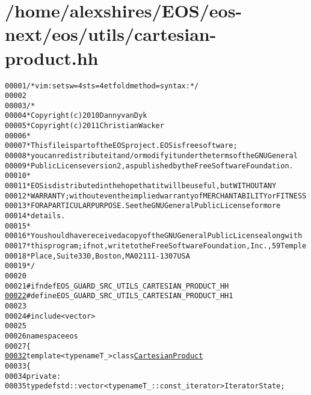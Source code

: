 \hypertarget{cartesian-product_8hh_source}{
\section{/home/alexshires/EOS/eos-\/next/eos/utils/cartesian-\/product.hh}
}


\begin{footnotesize}\begin{alltt}
00001 \textcolor{comment}{/* vim: set sw=4 sts=4 et foldmethod=syntax : */}
00002 
00003 \textcolor{comment}{/*}
00004 \textcolor{comment}{ * Copyright (c) 2010 Danny van Dyk}
00005 \textcolor{comment}{ * Copyright (c) 2011 Christian Wacker}
00006 \textcolor{comment}{ *}
00007 \textcolor{comment}{ * This file is part of the EOS project. EOS is free software;}
00008 \textcolor{comment}{ * you can redistribute it and/or modify it under the terms of the GNU General}
00009 \textcolor{comment}{ * Public License version 2, as published by the Free Software Foundation.}
00010 \textcolor{comment}{ *}
00011 \textcolor{comment}{ * EOS is distributed in the hope that it will be useful, but WITHOUT ANY}
00012 \textcolor{comment}{ * WARRANTY; without even the implied warranty of MERCHANTABILITY or FITNESS}
00013 \textcolor{comment}{ * FOR A PARTICULAR PURPOSE.  See the GNU General Public License for more}
00014 \textcolor{comment}{ * details.}
00015 \textcolor{comment}{ *}
00016 \textcolor{comment}{ * You should have received a copy of the GNU General Public License along with}
00017 \textcolor{comment}{ * this program; if not, write to the Free Software Foundation, Inc., 59 Temple}
00018 \textcolor{comment}{ * Place, Suite 330, Boston, MA  02111-1307  USA}
00019 \textcolor{comment}{ */}
00020 
00021 \textcolor{preprocessor}{#ifndef EOS\_GUARD\_SRC\_UTILS\_CARTESIAN\_PRODUCT\_HH}
\hypertarget{cartesian-product_8hh_source_l00022}{}\hyperlink{cartesian-product_8hh_a903a10839dae03fab1bdc91c3c42524f}{00022} \textcolor{preprocessor}{}\textcolor{preprocessor}{#define EOS\_GUARD\_SRC\_UTILS\_CARTESIAN\_PRODUCT\_HH 1}
00023 \textcolor{preprocessor}{}
00024 \textcolor{preprocessor}{#include <vector>}
00025 
00026 \textcolor{keyword}{namespace }eos
00027 \{
\hypertarget{cartesian-product_8hh_source_l00032}{}\hyperlink{classeos_1_1CartesianProduct}{00032}     \textcolor{keyword}{template} <\textcolor{keyword}{typename} T\_> \textcolor{keyword}{class }\hyperlink{classeos_1_1CartesianProduct}{CartesianProduct}
00033     \{
00034         \textcolor{keyword}{private}:
00035             \textcolor{keyword}{typedef} std::vector<typename T\_::const\_iterator> IteratorState;

\end{alltt}
\end{footnotesize}
